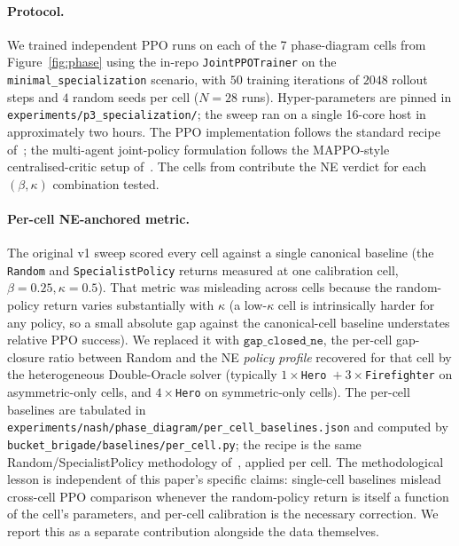 \documentclass{anvil-paper}
\begin{document}
\paragraph{Protocol.}
We trained independent PPO runs on each of the 7 phase-diagram cells from
Figure~\ref{fig:phase} using the in-repo \texttt{JointPPOTrainer} on the
\texttt{minimal\_specialization} scenario, with $50$ training iterations of
$2048$ rollout steps and $4$ random seeds per cell ($N{=}28$ runs).
Hyper-parameters are pinned in \texttt{experiments/p3\_specialization/}; the
sweep ran on a single 16-core host in approximately two hours. The PPO
implementation follows the standard recipe of~\citet{ppo2017}; the
multi-agent joint-policy formulation follows the MAPPO-style
centralised-critic setup of~\citet{mappo2022}. The cells from
\citep{bbnestructure} contribute the NE verdict for each
$(\beta,\kappa)$ combination tested.

\paragraph{Per-cell NE-anchored metric.}
The original v1 sweep scored every cell against a single canonical baseline
(the \texttt{Random} and \texttt{SpecialistPolicy} returns measured at one
calibration cell, $\beta{=}0.25,\kappa{=}0.5$). That metric was misleading
across cells because the random-policy return varies substantially with
$\kappa$ (a low-$\kappa$ cell is intrinsically harder for any policy, so a
small absolute gap against the canonical-cell baseline understates relative
PPO success). We replaced it with $\texttt{gap\_closed\_ne}$, the per-cell
gap-closure ratio between Random and the NE \emph{policy profile}
recovered for that cell by the heterogeneous Double-Oracle solver
(typically $1\times$\texttt{Hero}~$+~3\times$\texttt{Firefighter} on
asymmetric-only cells, and $4\times$\texttt{Hero} on symmetric-only cells).
The per-cell baselines are tabulated in
\texttt{experiments/nash/phase\_diagram/per\_cell\_baselines.json} and
computed by \texttt{bucket\_brigade/baselines/per\_cell.py}; the recipe is
the same Random/SpecialistPolicy methodology of~\citep{bbnestructure},
applied per cell. The methodological lesson is independent of this paper's
specific claims: single-cell baselines mislead cross-cell PPO comparison
whenever the random-policy return is itself a function of the cell's
parameters, and per-cell calibration is the necessary correction. We report
this as a separate contribution alongside the data themselves.
\end{document}
